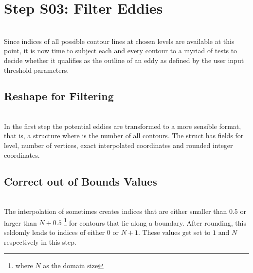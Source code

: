 \section{Step S03: Filter Eddies}
\\ 
Since indices of all possible contour lines at chosen levels are available at
this point, it is now time to subject each and every contour to a
myriad of tests to decide whether it qualifies as the outline of an eddy as
defined by the user input threshold parameters.
\subsection{Reshape for Filtering}
\\
In the first step the potential eddies are transformed to a more sensible
format, that is, a structure  where 
is the number of all contours. The struct has fields for level, number of
vertices, exact \ie interpolated coordinates and rounded integer coordinates.
\subsection{Correct out of Bounds Values}
\\
The interpolation of  sometimes creates indices that are
either smaller than $0.5$ or larger than $N+0.5$ \footnote{where $N$ as the
domain size} for contours that lie along a boundary. After rounding, this
seldomly leads to indices of either $0$ or $N+1$. These values get set to $1$
and $N$ respectively in this step.
